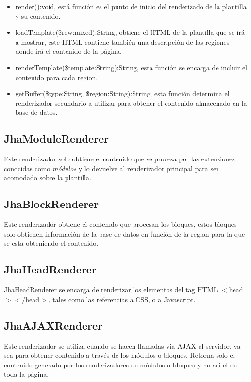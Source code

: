 \begin{itemize}
\item \textsf{render():void}, est\'a funci\'on es el punto de inicio del renderizado de la plantilla y su contenido.
\item \textsf{loadTemplate(\$row:mixed):String}, obtiene el HTML de la plantilla que se ir\'a a mostrar, este HTML contiene tambi\'en una descripci\'on de las regiones donde ir\'a el contenido de la p\'agina.
\item \textsf{renderTemplate(\$template:String):String}, esta funci\'on se encarga de incluir el contenido para cada region.
\item \textsf{getBuffer(\$type:String, \$region:String):String}, esta funci\'on determina el renderizador secundario a utilizar para obtener el contenido almacenado en la base de datos.
\end{itemize}

\subsection{JhaModuleRenderer}
Este renderizador solo obtiene el contenido que se procesa por las extensiones conocidas como \textit{m\'odulos} y lo devuelve al renderizador principal para ser acomodado sobre la plantilla.

\subsection{JhaBlockRenderer}
Este renderizador obtiene el contenido que procesan los bloques, estos bloques solo obtienen informaci\'on de la base de datos en funci\'on de la region para la que se esta obteniendo el contenido.

\subsection{JhaHeadRenderer}
JhaHeadRenderer se encarga de renderizar los elementos del tag HTML $<$head$><$/head$>$, tales como las referencias a CSS, o a Javascript.

\subsection{JhaAJAXRenderer}
Este renderizador se utiliza cuando se hacen llamadas via AJAX al servidor, ya sea para obtener contenido a trav\'es de los m\'odulos o bloques. Retorna solo el contenido generado por los renderizadores de m\'odulos o bloques y no asi el de toda la p\'agina.


